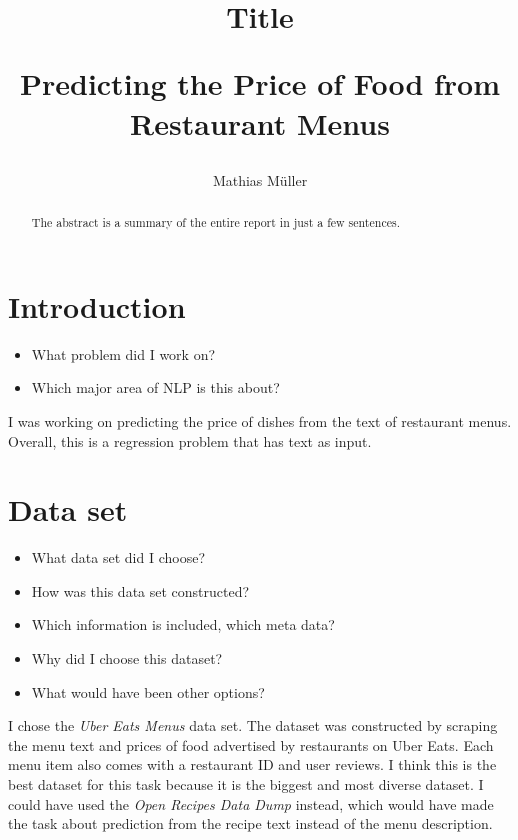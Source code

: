 \documentclass[11pt]{article}
\title{Title \\

\begin{tcolorbox}[colback=green!5!white,colframe=green!75!black,title=Example]
  Predicting the Price of Food from Restaurant Menus
\end{tcolorbox}

}
\author{Mathias Müller}
\begin{document}
\maketitle

\begin{abstract}
The abstract is a summary of the entire report in just a few sentences.
\end{abstract}

\section{Introduction}

\begin{itemize}
    \item What problem did I work on?
    \item Which major area of NLP is this about?
\end{itemize}

\begin{tcolorbox}[colback=green!5!white,colframe=green!75!black,title=Example]
  I was working on predicting the price of dishes from the text of restaurant menus.
  Overall, this is a regression problem that has text as input.
\end{tcolorbox}

\section{Data set}

\begin{itemize}
    \item What data set did I choose?
    \item How was this data set constructed?
    \item Which information is included, which meta data?
    \item Why did I choose this dataset?
    \item What would have been other options?
\end{itemize}

\begin{tcolorbox}[colback=green!5!white,colframe=green!75!black,title=Example]
  I chose the \textit{Uber Eats Menus} data set.
  The dataset was constructed by scraping the menu text and prices of food advertised by restaurants on Uber Eats.
  Each menu item also comes with a restaurant ID and user reviews.
  I think this is the best dataset for this task because it is the biggest and most diverse dataset.
  I could have used the \textit{Open Recipes Data Dump} instead, which would have made the task about prediction from the recipe text instead of the menu description.
\end{tcolorbox}
\end{document}
